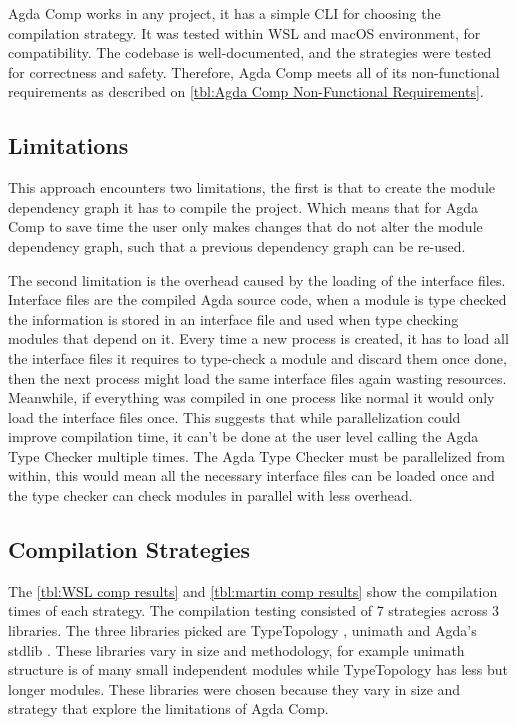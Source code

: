 Agda Comp works in any project, it has a simple CLI for
choosing the compilation strategy. It was tested within WSL and macOS
environment, for compatibility. The codebase is well-documented, and the
strategies were tested for correctness and safety. Therefore, Agda Comp
meets all of its non-functional requirements as described on \cref{tbl:Agda
Comp Non-Functional Requirements}.

\subsection{Limitations} \label{sub:eval comp limitations}

This approach encounters two limitations, the first is that to create the
module dependency graph it has to compile the project. Which means that for
Agda Comp to save time the user only makes changes that do not alter the module
dependency graph, such that a previous dependency graph can be re-used.

The second limitation is the overhead caused by the loading of the interface
files. Interface files are the compiled Agda source code, when a module is type
checked the information is stored in an interface file and used when type checking
modules that depend on it. Every time a new process is created, it has to load
all the interface files it requires to type-check a module and discard them
once done, then the next process might load the same interface files again
wasting resources. Meanwhile, if everything was compiled in one process like
normal it would only load the interface files once. This suggests that while
parallelization could improve compilation time, it can't be done at the user
level calling the Agda Type Checker multiple times. The Agda Type Checker must
be parallelized from within, this would mean all the necessary interface files
can be loaded once and the type checker can check modules in parallel with less
overhead.

\subsection{Compilation Strategies} \label{sub:eval comp strat}

The \cref{tbl:WSL comp results} and \cref{tbl:martin comp results} show the
compilation times of each strategy. The compilation testing consisted of 7
strategies across 3 libraries. The three libraries picked are TypeTopology
\cite{type-topology}, unimath \cite{agda-unimath} and Agda's stdlib
\cite{stdlib}. These libraries vary in size and methodology, for example
unimath structure is of many small independent modules while TypeTopology has
less but longer modules. These libraries were chosen because they vary in size
and strategy that explore the limitations of Agda Comp.

